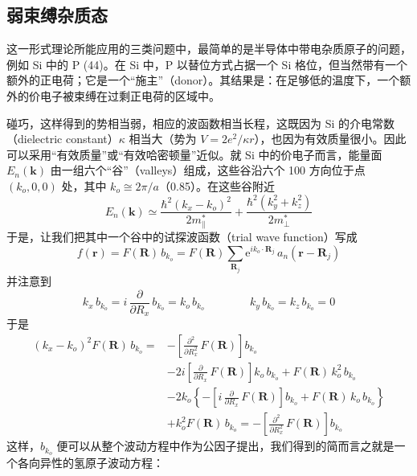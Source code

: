 \subsection{弱束缚杂质态}

这一形式理论所能应用的三类问题中，最简单的是半导体中带电杂质原子的问题，例如 Si 中的 P (44)。在 Si 中，P 以替位方式占据一个 Si 格位，但当然带有一个额外的正电荷；它是一个“施主”（donor）。其结果是：在足够低的温度下，一个额外的价电子被束缚在过剩正电荷的区域中。

碰巧，这样得到的势相当弱，相应的波函数相当长程，这既因为 Si 的介电常数（dielectric constant）$\kappa$ 相当大（势为 $V = 2e^2/\kappa r$），也因为有效质量很小。因此可以采用“有效质量”或“有效哈密顿量”近似。就 Si 中的价电子而言，能量面 $E_n(\mathbf{k})$ 由一组六个“谷”（valleys）组成，这些谷沿六个 100 方向位于点 $(k_o, 0, 0)$ 处，其中 $k_o \cong 2\pi/a$（0.85）。在这些谷附近
\begin{equation*}
E_n(\mathbf{k}) \simeq \frac{\hbar^2 (k_x - k_o)^2}{2m^*_{\parallel}} + \frac{\hbar^2 (k_y^2 + k_z^2)}{2m^*_{\perp}}
\end{equation*}
于是，让我们把其中一个谷中的试探波函数（trial wave function）写成
\begin{equation*}
f(\mathbf{r}) = F(\mathbf{R})\, b_{k_o} = F(\mathbf{R}) \sum_{\mathbf{R}_j} \mathrm{e}^{i k_o \cdot \mathbf{R}_j}\, a_n(\mathbf{r} - \mathbf{R}_j) \tag{20}
\end{equation*}
并注意到
\begin{equation*}
k_x\, b_{k_o} = i\,\frac{\partial}{\partial R_x}\, b_{k_o} = k_o\, b_{k_o} \qquad\qquad k_y\, b_{k_o} = k_z\, b_{k_o} = 0
\end{equation*}
于是
\begin{align*}
(k_x - k_o)^2 F(\mathbf{R})\, b_{k_o} ={}& -\left[\frac{\partial^2}{\partial R_x^2}\, F(\mathbf{R})\right] b_{k_o} \\
&- 2i\left[\frac{\partial}{\partial R_x}\, F(\mathbf{R})\right] k_o\, b_{k_o} + F(\mathbf{R})\, k_o^2\, b_{k_o} \\
&- 2k_o \left\{ -\left[i\,\frac{\partial}{\partial R_x}\, F(\mathbf{R})\right] b_{k_o} + F(\mathbf{R})\, k_o\, b_{k_o} \right\} \\
&+ k_o^2 F(\mathbf{R})\, b_{k_o} = -\left[\frac{\partial^2}{\partial R_x^2}\, F(\mathbf{R})\right] b_{k_o}
\end{align*}
这样，$b_{k_o}$ 便可以从整个波动方程中作为公因子提出，我们得到的简而言之就是一个各向异性的氢原子波动方程：


